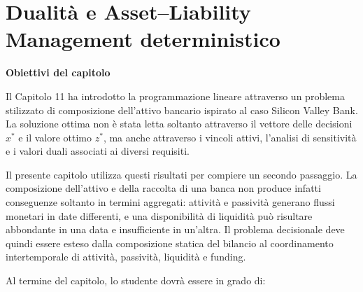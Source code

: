 
\chapter{Dualit\`a e Asset--Liability Management
deterministico}

\label{cap:dualita-alm-deterministico}

\medskip

\noindent
\textbf{Obiettivi del capitolo}

Il Capitolo 11 ha introdotto la programmazione lineare attraverso un problema
stilizzato di composizione dell'attivo bancario ispirato al caso Silicon
Valley Bank. La soluzione ottima non \`{e} stata letta soltanto attraverso il
vettore delle decisioni $x^*$ e il valore ottimo $z^*$, ma anche attraverso i
vincoli attivi, l'analisi di sensitivit\`{a} e i valori duali associati ai
diversi requisiti.

Il presente capitolo utilizza questi risultati per compiere un secondo
passaggio. La composizione dell'attivo e della raccolta di una banca non
produce infatti conseguenze soltanto in termini aggregati: attivit\`{a} e
passivit\`{a} generano flussi monetari in date differenti, e una disponibilit\`{a}
di liquidit\`{a} pu\`{o} risultare abbondante in una data e insufficiente in
un'altra. Il problema decisionale deve quindi essere esteso dalla composizione
statica del bilancio al coordinamento intertemporale di attivit\`{a},
passivit\`{a}, liquidit\`{a} e funding.

Al termine del capitolo, lo studente dovr\`{a} essere in grado di:

